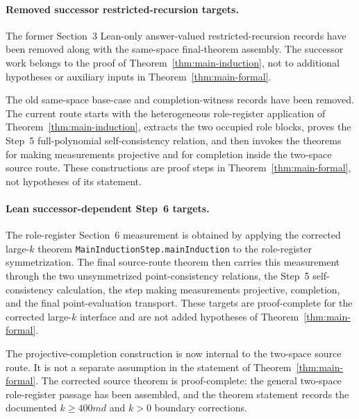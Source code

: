 	\paragraph{Removed successor restricted-recursion targets.}
		The former Section~3 Lean-only answer-valued restricted-recursion records
		have been removed along with the same-space final-theorem assembly.  The
		successor work belongs to the proof of Theorem~\ref{thm:main-induction},
		not to additional hypotheses or auxiliary inputs in
		Theorem~\ref{thm:main-formal}.

	\begin{remark}\label{rem:main-formal-step6-constructions}
		The old same-space base-case and completion-witness records have been
		removed.  The current route starts with the heterogeneous role-register
		application of Theorem~\ref{thm:main-induction}, extracts the two occupied
		role blocks, proves the Step~5 full-polynomial self-consistency relation,
		and then invokes the theorems for making measurements projective and for
		completion inside the two-space source route.  These constructions are
		proof steps in Theorem~\ref{thm:main-formal}, not hypotheses of its
		statement.
	\end{remark}


	\paragraph{Lean successor-dependent Step~6 targets.}
		The role-register Section~6 measurement is obtained by applying the
		corrected large-\(k\) theorem \texttt{MainInductionStep.mainInduction} to
		the role-register symmetrization.  The final source-route theorem then
		carries this measurement through the two unsymmetrized point-consistency
		relations, the Step~5 self-consistency calculation, the step making
		measurements projective, completion, and the final point-evaluation
		transport.  These targets are proof-complete for the corrected large-\(k\)
		interface and are not added hypotheses of Theorem~\ref{thm:main-formal}.


	\begin{remark}\label{rem:main-formal-successor-completion-construction}
		The projective-completion construction is now internal to the two-space
		source route.  It is not a separate assumption in the statement of
		Theorem~\ref{thm:main-formal}.  The corrected source theorem is
		proof-complete: the general two-space role-register passage has been
		assembled, and the theorem statement records the documented \(k\ge400md\)
		and \(k>0\) boundary corrections.
\end{remark}

